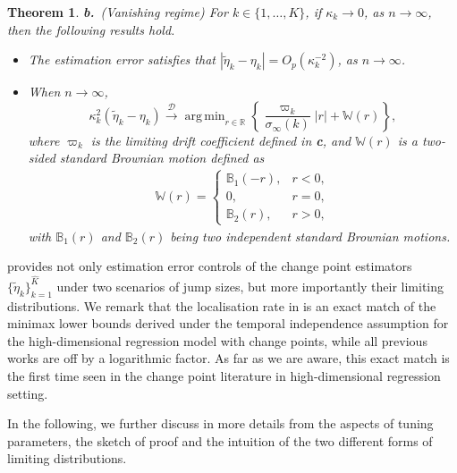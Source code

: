 \documentclass[11pt]{article}
\DeclareMathOperator*{\argmin}{arg\,min}
\theoremstyle{plain}
\newtheorem{theorem}{Theorem}
\theoremstyle{definition}
\begin{document}
\begin{theorem}
\noindent \textbf{b.}~(Vanishing regime)  For $k \in \{1, \ldots, K\}$, if $\kappa_k \to 0$, as $n \to \infty$, then the following results hold.   
    \begin{itemize}
        \item [\textbf{b.1.}] The estimation error satisfies that $|\widetilde{\eta}_k - \eta_k| = O_p(\kappa_k^{-2})$, as $n \to \infty$.
        \item [\textbf{b.2.}] When $n \to \infty$, 
        \[
            \kappa_k^{2}( \widetilde{\eta}_k - \eta_k) \overset{\mathcal{D}}{\longrightarrow} \argmin_{r \in \mathbb{R}} \left\{\frac{\varpi_k}{\sigma_{\infty}(k)}|r| + \mathbb{W}(r)\right\},
        \]
        where $\varpi_k$ is the limiting drift coefficient defined in \textbf{c}, and $\mathbb{W}(r)$ is a two-sided standard Brownian motion defined as 
        \begin{align*}
            \mathbb{W}(r) = \begin{cases}
                \mathbb{B}_1(-r), & r < 0,\\
                0, & r = 0,\\
                \mathbb{B}_2(r), & r > 0,
                \end{cases}
        \end{align*}
        with $\mathbb{B}_1(r)$ and $\mathbb{B}_2(r)$ being two independent standard Brownian motions.
    \end{itemize}
\end{theorem}

 provides not only estimation error controls of the change point estimators $\{\widetilde{\eta}_k\}_{k = 1}^{\widehat{K}}$ under two scenarios of jump sizes, but more importantly their limiting distributions. We remark that the localisation rate in  is an exact match of the minimax lower bounds derived under the temporal independence assumption \citep[e.g.][]{rinaldo2021localizing} for the high-dimensional regression model with change points, while all previous works are off by a logarithmic factor. As far as we are aware, this exact match is the first time seen in the change point literature in high-dimensional regression setting. 

In the following, we further discuss  in more details from the aspects of tuning parameters, the sketch of proof and the intuition of the two different forms of limiting distributions.
\end{document}
